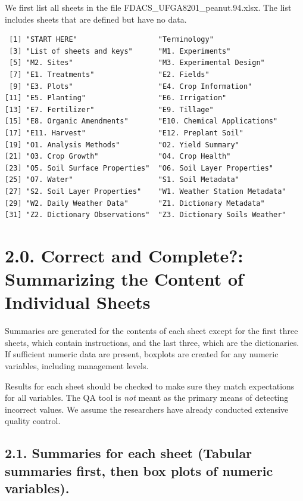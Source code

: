 \documentclass[
]{article}
\begin{document}
We first list all sheets in the file FDACS\_UFGA8201\_peanut.94.xlsx.
The list includes sheets that are defined but have no data.

\begin{verbatim}
 [1] "START HERE"                   "Terminology"                 
 [3] "List of sheets and keys"      "M1. Experiments"             
 [5] "M2. Sites"                    "M3. Experimental Design"     
 [7] "E1. Treatments"               "E2. Fields"                  
 [9] "E3. Plots"                    "E4. Crop Information"        
[11] "E5. Planting"                 "E6. Irrigation"              
[13] "E7. Fertilizer"               "E9. Tillage"                 
[15] "E8. Organic Amendments"       "E10. Chemical Applications"  
[17] "E11. Harvest"                 "E12. Preplant Soil"          
[19] "O1. Analysis Methods"         "O2. Yield Summary"           
[21] "O3. Crop Growth"              "O4. Crop Health"             
[23] "O5. Soil Surface Properties"  "O6. Soil Layer Properties"   
[25] "O7. Water"                    "S1. Soil Metadata"           
[27] "S2. Soil Layer Properties"    "W1. Weather Station Metadata"
[29] "W2. Daily Weather Data"       "Z1. Dictionary Metadata"     
[31] "Z2. Dictionary Observations"  "Z3. Dictionary Soils Weather"
\end{verbatim}

\newpage

\section{2.0. Correct and Complete?: Summarizing the Content of
Individual
Sheets}\label{correct-and-complete-summarizing-the-content-of-individual-sheets}

Summaries are generated for the contents of each sheet except for the
first three sheets, which contain instructions, and the last three,
which are the dictionaries. If sufficient numeric data are present,
boxplots are created for any numeric variables, including management
levels.

Results for each sheet should be checked to make sure they match
expectations for all variables. The QA tool is \emph{not} meant as the
primary means of detecting incorrect values. We assume the researchers
have already conducted extensive quality control.

\subsection{2.1. Summaries for each sheet (Tabular summaries first, then
box plots of numeric
variables).}\label{summaries-for-each-sheet-tabular-summaries-first-then-box-plots-of-numeric-variables.}
\end{document}
